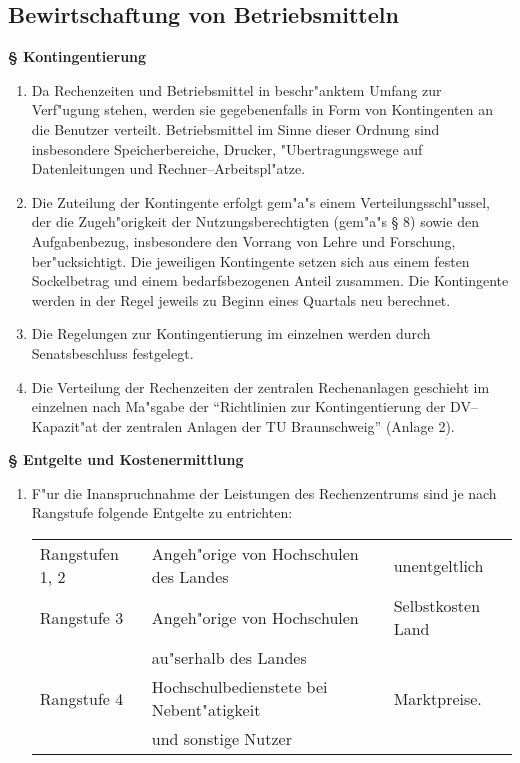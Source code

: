 \documentclass[12pt,titlepage,twoside]{scrartcl}
\newcounter{para_nr}
\newcommand{\Paragraph}[1]{{\large\bf\S{}\sf\textbf{\/\stepcounter{para_nr}\arabic{para_nr} #1}}}
\begin{document}
\begin{appendix}
\subsection{Bewirtschaftung von Betriebsmitteln}

\Paragraph{Kontingentierung}

\begin{enumerate}
  \item Da Rechenzeiten und Betriebsmittel in beschr"anktem Umfang zur
    Verf"ugung stehen, werden sie gegebenenfalls in Form von
    Kontingenten an die Benutzer verteilt. Betriebsmittel im Sinne dieser
    Ordnung sind insbesondere Speicherbereiche, Drucker, "Ubertragungswege
    auf Datenleitungen und Rechner--Arbeitspl"atze.

  \item Die Zuteilung der Kontingente erfolgt gem"a"s einem
    Verteilungsschl"ussel, der die Zugeh"origkeit der
    Nutzungsberechtigten (gem"a"s \S{} 8) sowie den Aufgabenbezug,
    insbesondere den Vorrang von Lehre und Forschung, ber"ucksichtigt.
    Die jeweiligen Kontingente setzen sich aus einem festen Sockelbetrag
    und einem bedarfsbezogenen Anteil zusammen. Die Kontingente werden in
    der Regel jeweils zu Beginn eines Quartals neu berechnet.

  \item Die Regelungen zur Kontingentierung im einzelnen werden durch
    Senatsbeschluss festgelegt.

  \item Die Verteilung der Rechenzeiten der zentralen Rechenanlagen geschieht
    im einzelnen nach Ma"sgabe der "`Richtlinien zur Kontingentierung der
    DV--Kapazit"at der zentralen Anlagen der TU Braunschweig"' (Anlage 2).
\end{enumerate}

\Paragraph{Entgelte und Kostenermittlung}

\begin{enumerate}
  \item F"ur die Inanspruchnahme der Leistungen des Rechenzentrums sind
    je nach Rangstufe folgende Entgelte zu entrichten:

    \begin{tabular}{lll}
      Rangstufen 1, 2&Angeh"orige von Hochschulen des Landes&unentgeltlich\\
      Rangstufe 3&Angeh"orige von Hochschulen&Selbstkosten Land\\
      &au"serhalb des Landes&\\
      Rangstufe 4&Hochschulbedienstete bei Nebent"atigkeit&Marktpreise.\\
      &und sonstige Nutzer&\\
    \end{tabular}


\end{enumerate}
\end{appendix}
\end{document}
